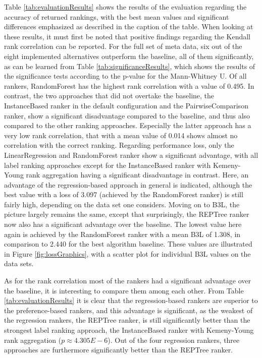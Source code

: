 Table \ref{tab:evaluationResults} shows the results of the evaluation regarding the accuracy of returned rankings, with the best mean values and significant differences emphasized as described in the caption of the table. When looking at these results, it must first be noted that positive findings regarding the Kendall rank correlation can be reported. For the full set of meta data, six out of the eight implemented alternatives outperform the baseline, all of them significantly, as can be learned from Table \ref{tab:significanceResults}, which shows the results of the significance tests according to the p-value for the Mann-Whitney U. Of all rankers, RandomForest has the highest rank correlation with a value of 0.495. In contrast, the two approaches that did not overtake the baseline, the InstanceBased ranker in the default configuration and the PairwiseComparison ranker, show a significant disadvantage compared to the baseline, and thus also compared to the other ranking approaches. Especially the latter approach has a very low rank correlation, that with a mean value of 0.014 shows almost no correlation with the correct ranking. Regarding performance loss, only the LinearRegression and RandomForest ranker show a significant advantage, with all label ranking approaches except for the InstanceBased ranker with Kemeny-Young rank aggregation having a significant disadvantage in contrast. Here, an advantage of the regression-based approach in general is indicated, although the best value with a loss of 3.097 (achieved by the RandomForest ranker) is still fairly high, depending on the data set one considers. Moving on to B3L, the picture largely remains the same, except that surprisingly, the REPTree ranker now also has a significant advantage over the baseline. The lowest value here again is achieved by the RandomForest ranker with a mean B3L of 1.308, in comparison to 2.440 for the best algorithm baseline. These values are illustrated in Figure \ref{fig:lossGraphics}, with a scatter plot for individual B3L values on the data sets.

As for the rank correlation most of the rankers had a significant advantage over the baseline, it is interesting to compare them among each other. From Table \ref{tab:evaluationResults} it is clear that the regression-based rankers are superior to the preference-based rankers, and this advantage is significant, as the weakest of the regression rankers, the REPTree ranker, is still significantly better than the strongest label ranking approach, the InstanceBased ranker with Kemeny-Young rank aggregation ($p \approx 4.305E-6$). Out of the four regression rankers, three approaches are furthermore significantly better than the REPTree ranker. 

